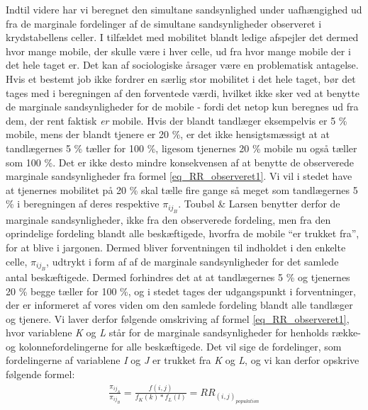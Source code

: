 Indtil videre har vi beregnet den simultane sandsynlighed under uafhængighed ud fra de marginale fordelinger af de simultane sandsynligheder observeret i krydstabellens celler. I tilfældet med mobilitet blandt ledige afspejler det dermed hvor mange mobile, der skulle være i hver celle, ud fra hvor mange mobile der i det hele taget er. Det kan af sociologiske årsager være en problematisk antagelse. Hvis et bestemt job ikke fordrer en særlig stor mobilitet i det hele taget, bør det tages med i beregningen af den forventede værdi, hvilket ikke sker ved at benytte de marginale sandsynligheder for de mobile - fordi det netop kun beregnes ud fra dem, der rent faktisk \emph{er} mobile. Hvis der blandt tandlæger eksempelvis er 5 \% mobile, mens der blandt tjenere er 20 \%, er det ikke hensigtsmæssigt at at tandlægernes 5 \% tæller for 100 \%, ligesom tjenernes 20 \% mobile nu også tæller som 100 \%. Det er ikke desto mindre konsekvensen af at benytte de observerede marginale sandsynligheder fra formel \ref{eq_RR_observeret1}. 
Vi vil i stedet have at tjenernes mobilitet på 20 \% skal tælle fire gange så meget som tandlægernes 5 \% i beregningen af deres respektive $\pi_{ij_{B}}$. Toubøl \& Larsen benytter derfor de marginale sandsynligheder, ikke fra den observerede fordeling, men fra den oprindelige fordeling blandt alle beskæftigede, hvorfra de mobile “er trukket fra”, for at blive i jargonen. Dermed bliver forventningen til indholdet i den enkelte celle, $\pi_{ij_{B}}$, udtrykt i form af af de marginale sandsynligheder for det samlede antal beskæftigede. Dermed forhindres det at at tandlægernes 5 \% og tjenernes 20 \% begge tæller for 100 \%, og i stedet tages der udgangspunkt i forventninger, der er informeret af vores viden om den samlede fordeling blandt alle tandlæger og tjenere.  Vi laver derfor følgende omskriving af formel \ref{eq_RR_observeret1}, hvor variablene \emph{K} og \emph{L} står for de marginale sandsynligheder for henholds række- og kolonnefordelingerne for alle beskæftigede. Det vil sige de fordelinger, som fordelingerne af variablene \emph{I} og \emph{J} er trukket fra \emph{K} og \emph{L}, og vi kan derfor opskrive følgende formel:
%
\begin{align} \label{eq_RR_observeret2}
\frac{\pi_{ij_{A}}}{\pi_{ij_{B}}} = \frac{f(i,j)}{f_{K}(k)*f_{L}(l)} = RR_{(i,j)_{population}}
\end{align} 
%

